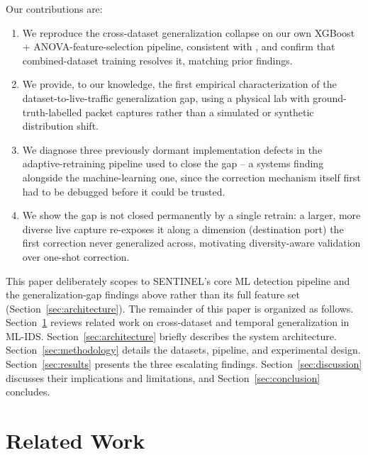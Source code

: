 \documentclass[conference]{IEEEtran}
\begin{document}
Our contributions are:
\begin{enumerate}
\item We reproduce the cross-dataset generalization collapse on our own
      XGBoost + ANOVA-feature-selection pipeline, consistent with
      \cite{cantone2024crossdataset}, and confirm that combined-dataset
      training resolves it, matching prior findings.
\item We provide, to our knowledge, the first empirical characterization of
      the dataset-to-live-traffic generalization gap, using a physical
      lab with ground-truth-labelled packet captures rather than a
      simulated or synthetic distribution shift.
\item We diagnose three previously dormant implementation defects in the
      adaptive-retraining pipeline used to close the gap -- a systems
      finding alongside the machine-learning one, since the correction
      mechanism itself first had to be debugged before it could be
      trusted.
\item We show the gap is not closed permanently by a single retrain: a
      larger, more diverse live capture re-exposes it along a dimension
      (destination port) the first correction never generalized across,
      motivating diversity-aware validation over one-shot correction.
\end{enumerate}

This paper deliberately scopes to SENTINEL's core ML detection pipeline
and the generalization-gap findings above rather than its full feature set
(Section~\ref{sec:architecture}). The remainder of
this paper is organized as follows. Section~\ref{sec:related} reviews
related work on cross-dataset and temporal generalization in ML-IDS.
Section~\ref{sec:architecture} briefly describes the system architecture.
Section~\ref{sec:methodology} details the datasets, pipeline, and
experimental design. Section~\ref{sec:results} presents the three
escalating findings. Section~\ref{sec:discussion} discusses their
implications and limitations, and Section~\ref{sec:conclusion} concludes.

\section{Related Work}
\label{sec:related}
\end{document}

